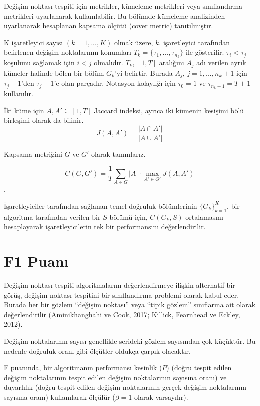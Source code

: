 \documentclass[12pt,twoside]{deuthesis}
\begin{document}
Değişim noktası tespiti için metrikler, kümeleme metrikleri veya sınıflandırma metrikleri uyarlanarak kullanılabilir. Bu bölümde kümeleme analizinden uyarlanarak hesaplanan kapsama ölçütü (cover metric) tanıtılmıştır.

K işaretleyici sayısı \((k=1,...,K)\) olmak üzere, \(k.\) işaretleyici tarafından belirlenen değişim noktalarının konumları \(T_k = \{\tau_1,...,\tau_{n_k}\}\) ile gösterilir. \(\tau_i < \tau_j\) koşulunu sağlamak için \(i < j\) olmalıdır. \(T_k\), \([1, T]\) aralığını \(A_j\) adı verilen ayrık kümeler halinde bölen bir bölüm \(G_k\)'yi belirtir. Burada \(A_j\), \(j = 1,...,n_k +1\) için \(\tau_{j} -1\)'den \(\tau_{j} -1\)'e olan parçadır. Notasyon kolaylığı için \(\tau_0 = 1\) ve \(\tau_{n_k+1} = T +1\) kullanılır.

İki küme için \(A, A' \subseteq [1, T ]\) Jaccard indeksi, ayrıca iki kümenin kesişimi bölü birleşimi olarak da bilinir. \[J(A,A')=\frac{|A\cap A'|}{|A\cup A'|}\]

Kapsama metriğini \(G\) ve \(G'\) olarak tanımlarız.

\[C(G,G') = \frac{1}{T} \sum_{A \in G} |A| \cdot \max_{A' \in G'} J(A,A')\].

İşaretleyiciler tarafından sağlanan temel doğruluk bölümlerinin \(\{G_k\}_{k=1}^K\), bir algoritma tarafından verilen bir \(S\) bölümü için, \(C(G_k,S)\) ortalamasını hesaplayarak işaretleyicilerin tek bir performansını değerlendirilir.

\hypertarget{f1-puanux131}{%
\section{F1 Puanı}\label{f1-puanux131}}

Değişim noktası tespiti algoritmalarını değerlendirmeye ilişkin alternatif bir görüş, değişim noktası tespitini bir sınıflandırma problemi olarak kabul eder. Burada her bir gözlem ``değişim noktası'' veya ``tipik gözlem'' sınıflarına ait olarak değerlendirilir (Aminikhanghahi ve Cook, 2017; Killick, Fearnhead ve Eckley, 2012).

Değişim noktalarının sayısı genellikle serideki gözlem sayısından çok küçüktür. Bu nedenle doğruluk oranı gibi ölçütler oldukça çarpık olacaktır.

F puanında, bir algoritmanın performansı kesinlik (\(P\)) (doğru tespit edilen değişim noktalarının tespit edilen değişim noktalarının sayısına oranı) ve duyarlılık (doğru tespit edilen değişim noktalarının gerçek değişim noktalarının sayısına oranı) kullanılarak ölçülür (\(\beta = 1\) olarak varsayılır).
\end{document}

